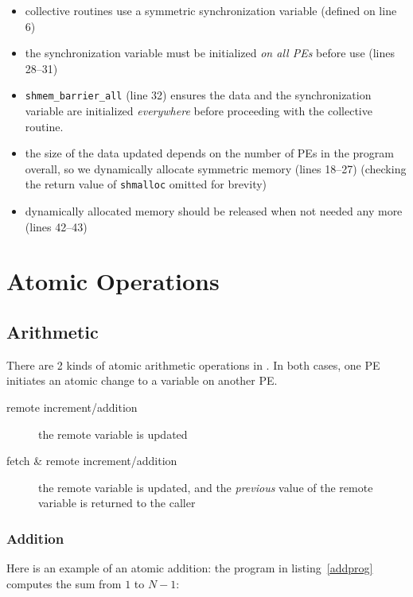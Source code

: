 \begin{itemize}
\item collective routines use a symmetric synchronization variable
  (defined on line 6) 
\item the synchronization variable must be initialized \emph{on all
  PEs} before use (lines 28--31)
\item \texttt{shmem\_barrier\_all} (line 32) ensures the data and the
  synchronization variable are initialized \emph{everywhere} before
  proceeding with the collective routine.
\item the size of the data updated depends on the number of PEs in the
  program overall, so we dynamically allocate symmetric memory (lines
  18--27) (checking the return value of \texttt{shmalloc} omitted for
  brevity)
\item dynamically allocated memory should be released when not needed
  any more (lines 42--43)
\end{itemize}

\section{Atomic Operations}

\subsection{Arithmetic}

There are 2 kinds of atomic arithmetic operations in \openshmem.  In
both cases, one PE initiates an atomic change to a variable on another
PE.

\begin{description}
  \item[{remote increment/addition}] the remote variable is updated
  \item[{fetch \& remote increment/addition}] the remote variable is
    updated, and the \emph{previous} value of the remote variable is
    returned to the caller
\end{description}

\subsubsection{Addition}

Here is an example of an atomic addition: the program in listing~\ref{addprog}
computes the sum from $1$ to $N-1$:

\begin{minipage}{\linewidth}
\vspace{0.1in}
\vspace{0.1in}
\end{minipage}

